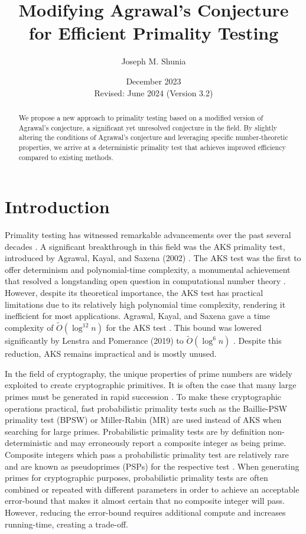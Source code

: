 \documentclass{article}
\title{Modifying Agrawal's Conjecture for Efficient Primality Testing}
\author{Joseph M. Shunia}
\date{December 2023 \\ \small Revised: June 2024 (Version 3.2) \normalsize}
\theoremstyle{plain}
\theoremstyle{definition}
\begin{document}
\maketitle

\begin{abstract}
We propose a new approach to primality testing based on a modified version of Agrawal's conjecture, a significant yet unresolved conjecture in the field. By slightly altering the conditions of Agrawal's conjecture and leveraging specific number-theoretic properties, we arrive at a deterministic primality test that achieves improved efficiency compared to existing methods.
\end{abstract}

\section{Introduction}
Primality testing has witnessed remarkable advancements over the past several decades \cite{miller1976, baillie1980, rabin1980, wagstaff1982pseudoprimes, aks2002}. A significant breakthrough in this field was the AKS primality test, introduced by Agrawal, Kayal, and Saxena (2002) \cite{aks2002}. The AKS test was the first to offer determinism and polynomial-time complexity, a monumental achievement that resolved a longstanding open question in computational number theory \cite{goldreich2008}. However, despite its theoretical importance, the AKS test has practical limitations due to its relatively high polynomial time complexity, rendering it inefficient for most applications. Agrawal, Kayal, and Saxena gave a time complexity of $\tilde{O}(\log^{12} n)$ for the AKS test \cite{aks2002}. This bound was lowered significantly by Lenstra and Pomerance (2019) to $\tilde{O}(\log^6 n)$ \cite{lenstra2019gaussian}. Despite this reduction, AKS remains impractical and is mostly unused.

In the field of cryptography, the unique properties of prime numbers are widely exploited to create cryptographic primitives. It is often the case that many large primes must be generated in rapid succession \cite{lenstra1987elliptic}. To make these cryptographic operations practical, fast probabilistic primality tests such as the Baillie-PSW primality test (BPSW) \cite{baillie1980} or Miller-Rabin (MR) \cite{miller1976, rabin1980} are used instead of AKS when searching for large primes. Probabilistic primality tests are by definition non-deterministic and may erroneously report a composite integer as being prime. Composite integers which pass a probabilistic primality test are relatively rare and are known as pseudoprimes (PSPs) for the respective test \cite{wagstaff1982pseudoprimes}. When generating primes for cryptographic purposes, probabilistic primality tests are often combined or repeated with different parameters in order to achieve an acceptable error-bound that makes it almost certain that no composite integer will pass. However, reducing the error-bound requires additional compute and increases running-time, creating a trade-off.
\end{document}
